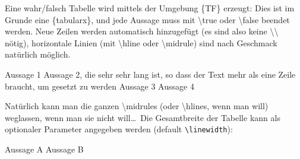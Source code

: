 \documentclass[hyperworksheet]{drcschool}
\newcommand*{\cs}[1]{\textup{\ttfamily\textbackslash#1}}                   %
\newcommand*{\env}[1]{\textup{\ttfamily\{#1\}}}                            %
\begin{document}
\begin{worksheet}
Eine wahr/falsch Tabelle wird mittels der Umgebung \env{TF} erzeugt: Dies ist im Grunde
eine \env{tabularx}, und jede Aussage muss mit \cs{true} oder \cs{false} beendet werden.
Neue Zeilen werden automatisch hinzugefügt (es sind also keine \cs{\textbackslash} nötig),
horizontale Linien (mit \cs{hline} oder \cs{midrule}) sind nach Geschmack natürlich möglich.
\begin{TF}
Aussage 1 \true
\midrule
Aussage 2, die sehr sehr lang ist, so dass der Text mehr als eine Zeile braucht, um gesetzt zu werden \false
\midrule
Aussage 3 \false
\midrule
Aussage 4 \true
\end{TF}
Natürlich kann man die ganzen \cs{midrule}s (oder \cs{hline}s, wenn man will) weglassen,
wenn man sie nicht will\ldots\ Die Gesamtbreite der Tabelle kann als optionaler Parameter
angegeben werden (default \texttt{\textbackslash linewidth}):
\begin{TF}[.35\linewidth]
Aussage A \true
Aussage B \false
\end{TF}

\end{worksheet}

\end{document}

